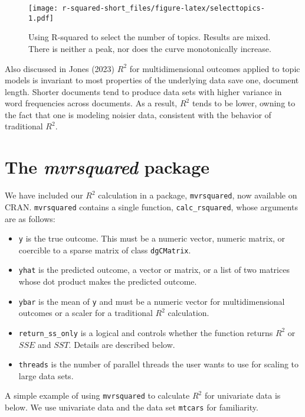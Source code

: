 \begin{figure}
\centering
\texttt{[image: r-squared-short\_files/figure-latex/selecttopics-1.pdf]}
\caption{\label{fig:selecttopics}Using R-squared to select the number of topics. Results are mixed. There is neither a peak, nor does the curve monotonically increase.}
\end{figure}

Also discussed in Jones (2023) \(R^2\) for multidimensional outcomes applied to topic models is invariant to most properties of the underlying data save one, document length. Shorter documents tend to produce data sets with higher variance in word frequencies across documents. As a result, \(R^2\) tends to be lower, owning to the fact that one is modeling noisier data, consistent with the behavior of traditional \(R^2\).

\hypertarget{the-mvrsquared-package}{%
\section{\texorpdfstring{The \emph{mvrsquared} package}{The mvrsquared package}}\label{the-mvrsquared-package}}

We have included our \(R^2\) calculation in a package, \texttt{mvrsquared}, now available on CRAN. \texttt{mvrsquared} contains a single function, \texttt{calc\_rsquared}, whose arguments are as follows:

\begin{itemize}
\tightlist
\item
  \texttt{y} is the true outcome. This must be a numeric vector, numeric matrix, or coercible to a sparse matrix of class \texttt{dgCMatrix}.
\item
  \texttt{yhat} is the predicted outcome, a vector or matrix, or a list of two matrices whose dot product makes the predicted outcome.
\item
  \texttt{ybar} is the mean of \texttt{y} and must be a numeric vector for multidimensional outcomes or a scaler for a traditional \(R^2\) calculation.
\item
  \texttt{return\_ss\_only} is a logical and controls whether the function returns \(R^2\) or \(SSE\) and \(SST\). Details are described below.
\item
  \texttt{threads} is the number of parallel threads the user wants to use for scaling to large data sets.
\end{itemize}

A simple example of using \texttt{mvrsquared} to calculate \(R^2\) for univariate data is below. We use univariate data and the data set \texttt{mtcars} for familiarity.

